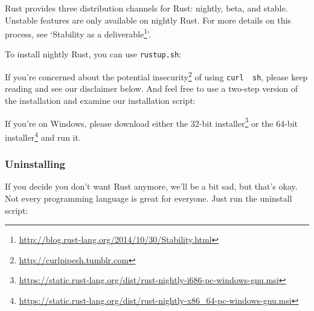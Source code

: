 \documentclass[a4paper,]{book}
\newenvironment{Shaded}{\begin{snugshade}}{\end{snugshade}}
\newcommand{\KeywordTok}[1]{\textcolor[rgb]{0.13,0.29,0.53}{\textbf{{#1}}}}
\newcommand{\NormalTok}[1]{{#1}}
\renewcommand{\href}[2]{#2\footnote{\url{#1}}}
\begin{document}
Rust provides three distribution channels for Rust: nightly, beta, and
stable. Unstable features are only available on nightly Rust. For more
details on this process, see
`\href{http://blog.rust-lang.org/2014/10/30/Stability.html}{Stability as
a deliverable}'.

To install nightly Rust, you can use \texttt{rustup.sh}:

\begin{Shaded}
\end{Shaded}

If you're concerned about the
\href{http://curlpipesh.tumblr.com}{potential insecurity} of using
\texttt{curl\ \textbar{}\ sh}, please keep reading and see our
disclaimer below. And feel free to use a two-step version of the
installation and examine our installation script:

\begin{Shaded}
\end{Shaded}

If you're on Windows, please download either the
\href{https://static.rust-lang.org/dist/rust-nightly-i686-pc-windows-gnu.msi}{32-bit
installer} or the
\href{https://static.rust-lang.org/dist/rust-nightly-x86_64-pc-windows-gnu.msi}{64-bit
installer} and run it.

\subsubsection{Uninstalling}\label{uninstalling-1}

If you decide you don't want Rust anymore, we'll be a bit sad, but
that's okay. Not every programming language is great for everyone. Just
run the uninstall script:

\begin{Shaded}
\end{Shaded}
\end{document}
